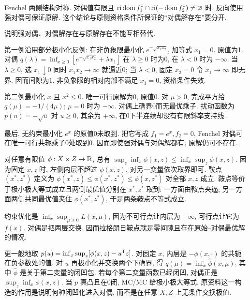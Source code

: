 Fenchel 两侧结构对称. 对偶值有限且 $\operatorname{ri}\operatorname{dom} f_1^*\cap\operatorname{ri}(-\operatorname{dom} f_2^*)\ne\varnothing$ 时, 反向使用强对偶可保证原解. 这个结论与原侧资格条件所保证的“对偶解存在”要分开.

\begin{example}
说明强对偶、对偶解存在与原解存在不能互相替代.
\end{example}
\begin{solution}
第一例沿用部分极小化反例: 在非负象限最小化 $e^{-\sqrt{x_1x_2}}$, 加等式 $x_1=0$. 原值为1. 对偶 $q(\lambda)=\inf_{x\ge0}[e^{-\sqrt{x_1x_2}}+\lambda x_1]$ 在 $\lambda\ge0$ 时为0, 在 $\lambda<0$ 时为 $-\infty$. 当 $\lambda\ge0$, 选 $x_1\downarrow0$ 同时 $x_1x_2\to\infty$ 就逼近0; 当 $\lambda<0$, 固定 $x_2=0$ 令 $x_1\to\infty$ 即无界. 因而间隙为1. 非负象限的相对内部不满足 $x_1=0$, 资格条件失效.

第二例最小化 $x$ 且 $x^2\le0$. 唯一可行原解为0, 原值0. 对 $\mu>0$, 完成平方给 $q(\mu)=-1/(4\mu)$; $\mu=0$ 时为 $-\infty$. 对偶上确界0而无最优乘子. 扰动函数为 $p(u)=-\sqrt u$ 对 $u\ge0$, 其余为 $+\infty$, 在0下半连续却没有有限斜率支持线.

最后, 无约束最小化 $e^x$ 的原值0未取到. 把它写成 $f_1=e^x,f_2=0$, Fenchel 对偶可在唯一可行共轭乘子0处取到0. 因而即使强对偶与对偶解都有, 原解仍可不存在.
\end{solution}

对任意有限值 $\phi:X\times Z\to\mathbb R$, 总有 $\sup_z\inf_x\phi(x,z)\le\inf_x\sup_z\phi(x,z)$. 因为固定 $x,z$ 时, 左侧内层不超过 $\phi(x,z)$, 对另一变量依次取界即可. 鞍点 $(x^*,z^*)$ 定义为
$\phi(x^*,z)\le\phi(x^*,z^*)\le\phi(x,z^*)$ 对全部 $x,z$ 成立. 鞍点等价于极小极大等式成立且两侧最优值分别在 $x^*,z^*$ 取到: 一方面由鞍点夹逼; 另一方面两侧共同最优值夹住 $\phi(x^*,z^*)$, 于是两条鞍点不等式成立.

约束优化是 $\inf_x\sup_{\mu\ge0}L(x,\mu)$, 因为不可行点让内层为 $+\infty$, 可行点让它为 $f(x)$. 对偶是把两层交换. 因而拉格朗日鞍点就是零间隙且存在原始--对偶最优解的情况.

更一般地取 $p(u)=\inf_x\sup_z[\phi(x,z)-u^{\mathsf T} z]$. 对固定 $x$, 内层是 $-\phi(x,\cdot)$ 的共轭在负参数处的值. 对 $u$ 再极小化并交换两个下确界, 得 $q(\mu)=\inf_x\widehat\phi(x,\mu)$, 其中 $\widehat\phi$ 是关于第二变量的闭凹包. 若每个第二变量函数已经闭凹, 对偶正是 $\sup_z\inf_x\phi(x,z)$. 当 $p$ 真凸且在0闭, MC/MC 给极小极大等式. 原资料这一构造的作用是说明何种闭凹化进入对偶, 而不是在任意 $X,Z$ 上无条件交换极值.

